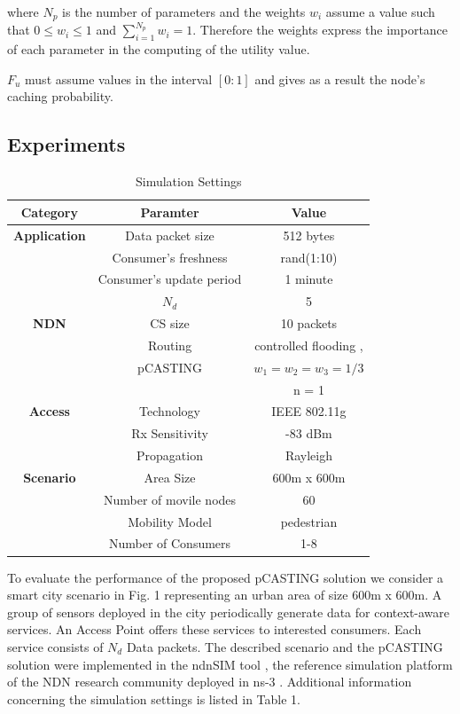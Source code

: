 \documentclass[conference]{IEEEtran}
\begin{document}
where $N_p$ is the number of parameters and the weights $w_i$ assume a value such that $0 \leq w_i \leq 1$ and $\sum_{i = 1}^{N_p} w_i = 1$.
Therefore the weights express the importance of each parameter in the computing of the utility value.

$F_u$ must assume values in the interval $[0 : 1]$ and gives as a result the node's caching probability.

\subsection{Experiments}


\begin{table}[htbp]
    \caption{Simulation Settings}
    \begin{center}
    \begin{tabular}{c|c|c|}
    \textbf{Category} & \textbf{Paramter}& \textbf{Value} \\
    \hline
    \textbf{Application} & Data packet size & 512 bytes \\
    & Consumer's freshness & rand(1:10) \\
    & Consumer's update period & 1 minute \\
    & $N_d$ & 5 \\
    \hline
    \textbf{NDN} & CS size & 10 packets \\
    & Routing & controlled flooding \cite{b6}, \cite{b15} \\
    & pCASTING & $w_1 = w_2 = w_3 = 1 / 3$ \\
    & & n = 1 \\
    \hline
    \textbf{Access} & Technology & IEEE 802.11g \\
    & Rx Sensitivity & -83 dBm \\
    & Propagation & Rayleigh \\
    \hline
    \textbf{Scenario} & Area Size & 600m x 600m \\
    & Number of movile nodes & 60 \\
    & Mobility Model & pedestrian \cite{b16} \\
    & Number of Consumers & 1-8 \\
    \end{tabular}
    \label{tab1}
    \end{center}
\end{table}

To evaluate the performance of the proposed pCASTING solution we consider a smart city scenario in Fig. 1 representing an urban 
area of size 600m x 600m. A group of sensors deployed in the city periodically generate data for context-aware services. 
An Access Point offers these services to interested consumers. Each service consists of $N_d$ Data packets. The described scenario and the 
pCASTING solution were implemented in the ndnSIM tool \cite{b10}, the reference simulation platform of the NDN research community deployed 
in ns-3 \cite{b18}. Additional information concerning the simulation settings is listed in Table 1.
\end{document}
